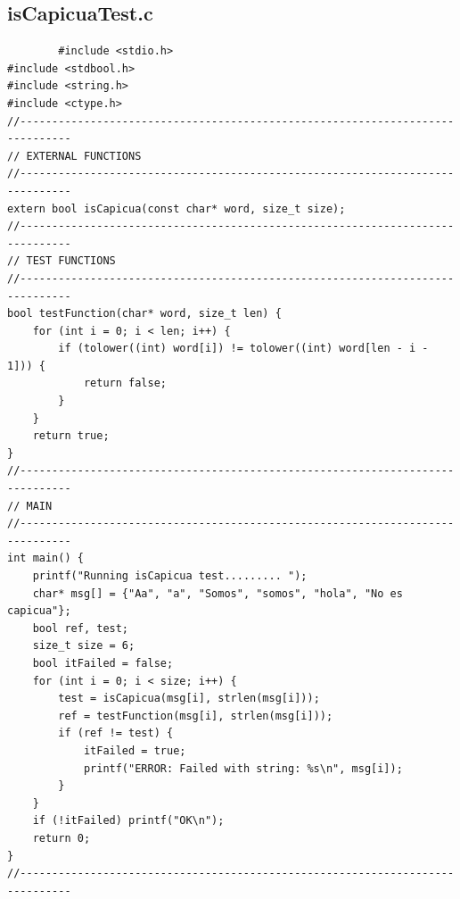 \documentclass[a4paper,10pt]{article}
\begin{document}
    \subsection{isCapicuaTest.c}
        \begin{lstlisting}
        #include <stdio.h>
#include <stdbool.h>
#include <string.h>
#include <ctype.h>
//------------------------------------------------------------------------------
// EXTERNAL FUNCTIONS
//------------------------------------------------------------------------------
extern bool isCapicua(const char* word, size_t size);
//------------------------------------------------------------------------------
// TEST FUNCTIONS
//------------------------------------------------------------------------------
bool testFunction(char* word, size_t len) {
    for (int i = 0; i < len; i++) {
        if (tolower((int) word[i]) != tolower((int) word[len - i - 1])) {
            return false;
        }
    }
    return true;
}
//------------------------------------------------------------------------------
// MAIN
//------------------------------------------------------------------------------
int main() {
    printf("Running isCapicua test......... ");
    char* msg[] = {"Aa", "a", "Somos", "somos", "hola", "No es capicua"};
    bool ref, test;
    size_t size = 6;
    bool itFailed = false;
    for (int i = 0; i < size; i++) {
        test = isCapicua(msg[i], strlen(msg[i]));
        ref = testFunction(msg[i], strlen(msg[i]));
        if (ref != test) {
            itFailed = true;
            printf("ERROR: Failed with string: %s\n", msg[i]);
        }
    }
    if (!itFailed) printf("OK\n");
    return 0;
}
//------------------------------------------------------------------------------
        \end{lstlisting}
        
\end{document}
